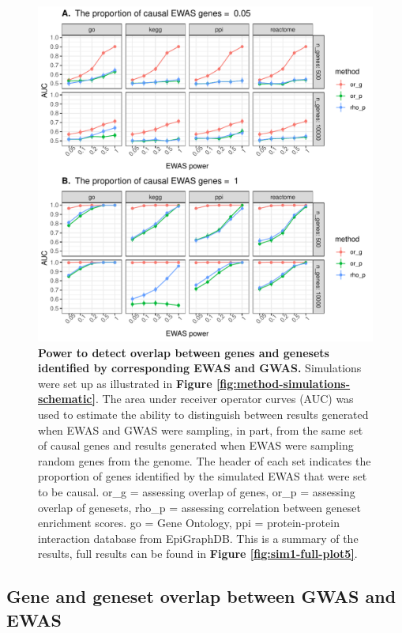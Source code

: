 \documentclass[11pt,twoside]{bristolthesis}
\begin{document}
\begin{figure}

{\centering \includegraphics[width=1\linewidth]{figure/06-ewas_gwas_comparison/methods_test_gene_up_auc_plot_all_databases_summary} 

}

\caption[Power to detect overlap between genes and genesets identified by corresponding EWAS and GWAS]{\textbf{Power to detect overlap between genes and genesets identified by corresponding EWAS and GWAS.} Simulations were set up as illustrated in \textbf{Figure \ref{fig:method-simulations-schematic}}. The area under receiver operator curves (AUC) was used to estimate the ability to distinguish between results generated when EWAS and GWAS were sampling, in part, from the same set of causal genes and results generated when EWAS were sampling random genes from the genome. The header of each set indicates the proportion of genes identified by the simulated EWAS that were set to be causal. or\_g = assessing overlap of genes, or\_p = assessing overlap of genesets, rho\_p = assessing correlation between geneset enrichment scores. go = Gene Ontology, ppi = protein-protein interaction database from EpiGraphDB. This is a summary of the results, full results can be found in \textbf{Figure \ref{fig:sim1-full-plot5}}.}\label{fig:sim1-summ-plot}
\end{figure}
\hypertarget{gwas-ewas-overlap}{%
\subsection{Gene and geneset overlap between GWAS and EWAS}\label{gwas-ewas-overlap}}
\end{document}
